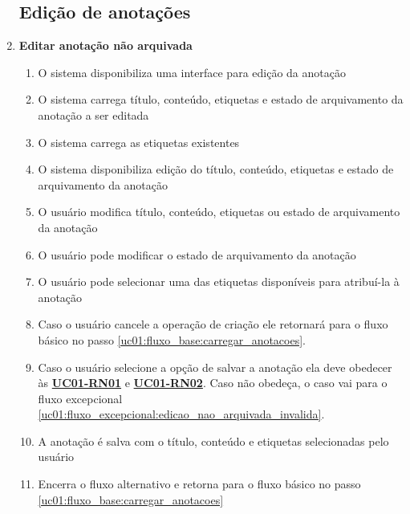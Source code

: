 \documentclass[
	12pt,				%
	oneside,			%
	a4paper,			%
	english,			%
	brazil,				%
	]{abntex2}
\begin{document}
\begin{enumerate}[label=\textbf{UC01-FA{\arabic*}},font=\normalsize]
    \subsection{Edição de anotações}
    \item \textbf{\normalsize Editar anotação não arquivada} \label{uc01:fluxo_alternativo:editar_anotacao_nao_arquivada}
    \begin{enumerate}[label={\arabic*}.]
        \item O sistema disponibiliza uma interface para edição da anotação
        \item O sistema carrega título, conteúdo, etiquetas e estado de arquivamento da anotação a ser editada
        \item O sistema carrega as etiquetas existentes
        \item O sistema disponibiliza edição do título, conteúdo, etiquetas e estado de arquivamento da anotação
        \item O usuário modifica título, conteúdo, etiquetas ou estado de arquivamento da anotação \label{uc01:fluxo_alternativo:editar_anotacao_nao_arquivada:pode_escrever}
        \item O usuário pode modificar o estado de arquivamento da anotação
        \item O usuário pode selecionar uma das etiquetas disponíveis para atribuí-la à anotação
        \item Caso o usuário cancele a operação de criação ele retornará para o fluxo básico no passo \ref{uc01:fluxo_base:carregar_anotacoes}.
        \item Caso o usuário selecione a opção de salvar a anotação ela deve obedecer às \textbf{\hyperref[uc01:rn01_validacao_anotacao]{UC01-RN01}} e \textbf{\hyperref[uc01:rn02_flag_arquivar]{UC01-RN02}}. Caso não obedeça, o caso vai para o fluxo excepcional \ref{uc01:fluxo_excepcional:edicao_nao_arquivada_invalida}.
        \item A anotação é salva com o título, conteúdo e etiquetas selecionadas pelo usuário
        \item Encerra o fluxo alternativo e retorna para o fluxo básico no passo \ref{uc01:fluxo_base:carregar_anotacoes}
    \end{enumerate}


\end{enumerate}
\end{document}
